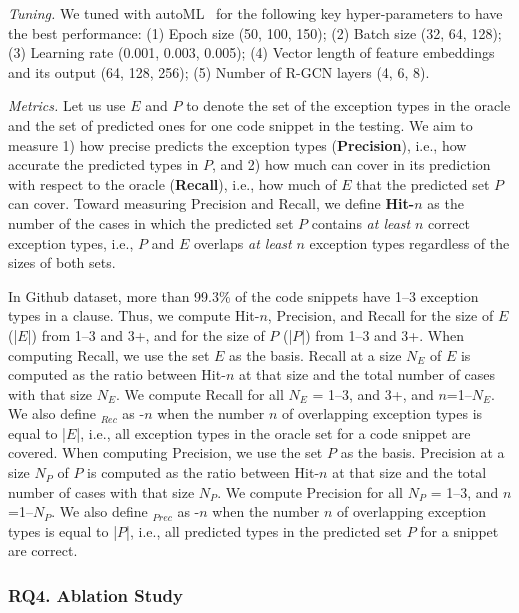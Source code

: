 {\em Tuning.} We tuned {\tool} with autoML~\cite{NNI} for the
following key hyper-parameters to have the best performance: (1) Epoch
size (50, 100, 150); (2) Batch size (32, 64, 128); (3) Learning rate
(0.001, 0.003, 0.005); (4) Vector length of feature embeddings and its
output (64, 128, 256); (5) Number of R-GCN layers (4, 6, 8).

{\em Metrics.} Let us use $E$ and $P$ to denote the set of the
exception types in the oracle and the set of predicted
ones for one code snippet in the testing. We aim to measure 1) how
precise {\tool} predicts the exception types ({\bf Precision}), i.e.,
how accurate the predicted types in $P$, and 2) how much {\tool} can
cover in its prediction with respect to the oracle ({\bf Recall}),
i.e., how much of $E$ that the predicted set $P$ can cover. Toward
measuring Precision and Recall, we define {\bf Hit-$n$} as the number
of the cases in which the predicted set $P$ contains
{\em at least} $n$ correct exception types, i.e., $P$ and $E$ overlaps
{\em at least} $n$ exception types regardless of the sizes of both
sets.

In Github dataset, more than 99.3\% of the code snippets have 1--3
exception types in a  clause. Thus, we compute Hit-$n$,
Precision, and Recall for the size of $E$ (|$E$|) from 1--3 and 3+,
and for the size of $P$ (|$P$|) from 1--3 and 3+.
%
When computing Recall, we use the set $E$ as the basis. Recall at a
size $N_E$ of $E$ is computed as the ratio between Hit-$n$ at that
size and the total number of cases with that size $N_E$. We compute
Recall for all $N_E$ = 1--3, and 3+, and $n$=1--$N_E$. We also define
$_{Rec}$ as -$n$ when the number $n$ of
overlapping exception types is equal to |$E$|, i.e., all exception
types in the oracle set for a code snippet are covered.
%
When computing Precision, we use the set $P$ as the basis. Precision
at a size $N_P$ of $P$ is computed as the ratio between Hit-$n$ at
that size and the total number of cases with that size $N_P$. We
compute Precision for all $N_P$ = 1--3, and $n$=1--$N_P$. We also
define $_{Prec}$ as -$n$ when the number $n$
of overlapping exception types is equal to |$P$|, i.e., all predicted
types in the predicted set $P$ for a snippet are
correct.



\subsubsection{RQ4. Ablation Study}

